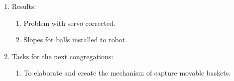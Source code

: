 \begin{enumerate}
	\item Results: 
	\begin{enumerate}
	  \item Problem with servo corrected.
	  
      \item Slopes for balls installed to robot.
      
    \end{enumerate}
    
	\item Tasks for the next congregations:
	\begin{enumerate}
	  \item To elaborate and create the mechanism of capture movable baskets.
	  
    \end{enumerate}     
\end{enumerate}
\fillpage
